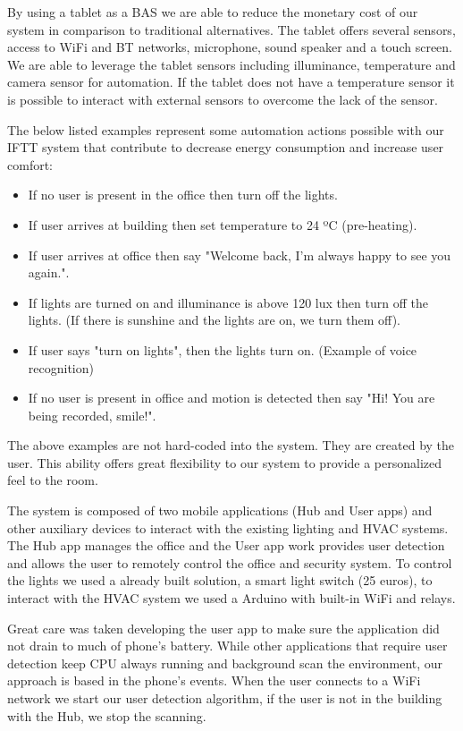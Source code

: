 By using a tablet as a \ac{BAS} we are able to reduce the monetary cost of our system in comparison to traditional alternatives. The tablet offers several sensors, access to \ac{WiFi} and \ac{BT} networks, microphone, sound speaker and a touch screen. We are able to leverage the tablet sensors including illuminance, temperature and camera sensor for automation. If the tablet does not have a temperature sensor it is possible to interact with external sensors to overcome the lack of the sensor.


The below listed examples represent some automation actions possible with our \ac{IFTT} system that contribute to decrease energy consumption and increase user comfort:

\begin{itemize}
\item If no user is present in the office then turn off the lights.
\item If user arrives at building then set temperature to 24 ºC (pre-heating). 
\item If user arrives at office then say "Welcome back, I'm always happy to see you again.".
\item If lights are turned on and illuminance is above 120 lux then turn off the lights. (If there is  sunshine and the lights are on, we turn them off).
\item If user says "turn on lights", then the lights turn on. (Example of voice recognition)
\item If no user is present in office and motion is detected then say "Hi! You are being recorded, smile!".
\end{itemize}

The above examples are not hard-coded into the system. They are created by the user. This ability offers great flexibility to our system to provide a personalized feel to the room.

The system is composed of two mobile applications (Hub and User apps) and other auxiliary devices to interact with the existing lighting and \ac{HVAC} systems. The Hub app manages the office and the User app work provides user detection and allows the user to remotely control the office and security system. To control the lights we used a already built solution, a smart light switch (25 euros), to interact with the \ac{HVAC} system we used a Arduino with built-in \ac{WiFi} and relays.

Great care was taken developing the user app to make sure the application did not drain to much of phone's battery. While other applications that require user detection keep \ac{CPU} always running and background scan the environment, our approach is based in the phone's events. When the user connects to a \ac{WiFi} network we start our user detection algorithm, if the user is not in the building with the Hub, we stop the scanning. 

